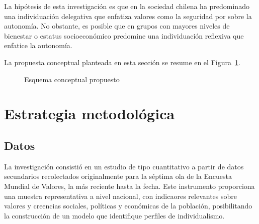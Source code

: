 \documentclass[
  letterpaper,
  DIV=11,
  numbers=noendperiod]{scrartcl}
\begin{document}
La hipótesis de esta investigación es que en la sociedad chilena ha
predominado una individuación delegativa que enfatiza valores como la
seguridad por sobre la autonomía. No obstante, es posible que en grupos
con mayores niveles de bienestar o estatus socioeconómico predomine una
individuación reflexiva que enfatice la autonomía.

La propuesta conceptual planteada en esta sección se resume en el
Figura~\ref{fig-esquema}.

\begin{figure}[H]


\caption{\label{fig-esquema}Esquema conceptual propuesto}

\end{figure}%

\section{Estrategia metodológica}\label{estrategia-metodoluxf3gica}

\subsection{Datos}\label{datos}

La investigación consistió en un estudio de tipo cuantitativo a partir
de datos secundarios recolectados originalmente para la séptima ola de
la Encuesta Mundial de Valores, la más reciente hasta la fecha. Este
instrumento proporciona una muestra representativa a nivel nacional, con
indicaores relevantes sobre valores y creencias sociales, políticas y
económicas de la población, posibilitando la construcción de un modelo
que identifique perfiles de individualismo.
\end{document}
